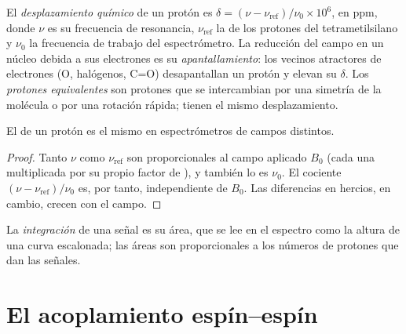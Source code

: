 \begin{definition}\label{def:b1:structure-spectroscopy:chemical-shift}
El \emph{desplazamiento químico} de un protón es
$\delta = (\nu - \nu_{\text{ref}})/\nu_0 \times 10^6$, en \unit{ppm}, donde
$\nu$ es su frecuencia de resonancia, $\nu_{\text{ref}}$ la de los
protones del tetrametilsilano y $\nu_0$ la frecuencia de trabajo del
espectrómetro. La reducción del campo en un núcleo debida a sus
electrones es su \emph{apantallamiento}: los
vecinos atractores de electrones (O, halógenos, C=O) desapantallan un
protón y elevan su $\delta$. Los \emph{protones
equivalentes} son protones que se
intercambian por una simetría de la molécula o por una rotación rápida;
tienen el mismo desplazamiento.
\end{definition}

\begin{proposition}\label{prop:b1:structure-spectroscopy:shift-field-independent}
El  de un protón es el mismo en espectrómetros de
campos distintos.
\end{proposition}

\begin{proof}
Tanto $\nu$ como $\nu_{\text{ref}}$ son proporcionales al campo aplicado
$B_0$ (cada una multiplicada por su propio factor de ), y
también lo es $\nu_0$. El cociente $(\nu - \nu_{\text{ref}})/\nu_0$ es,
por tanto, independiente de $B_0$. Las diferencias en hercios, en cambio,
crecen con el campo.
\end{proof}

\begin{definition}[Integración]\label{def:b1:structure-spectroscopy:integration}
La \emph{integración} de una señal es su área, que se lee
en el espectro como la altura de una curva escalonada; las áreas son
proporcionales a los números de protones que dan las señales.
\end{definition}

\section{El acoplamiento espín--espín}


